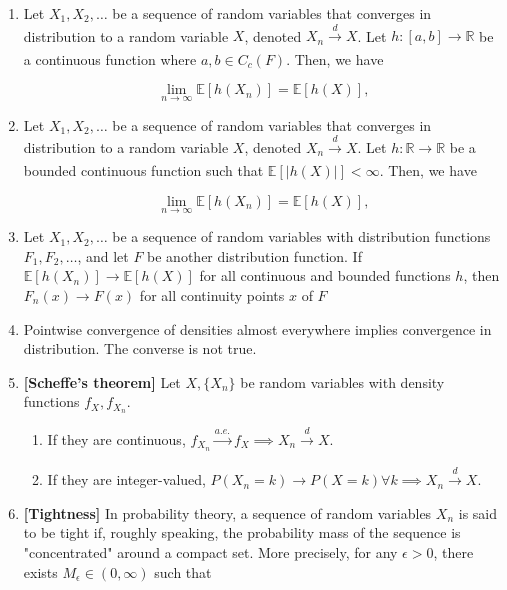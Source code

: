 \documentclass[12pt,oneside]{book}
\begin{document}
\begin{enumerate}
\item  Let $X_1, X_2, \ldots$ be a sequence of random variables that converges in distribution to a random variable $X$, denoted $X_n \xrightarrow[]{d} X$. Let $h:[a,b] \rightarrow \mathbb{R}$ be a continuous function where $a,b\in C_c(F)$. Then, we have

\begin{equation*}
\lim_{n\rightarrow \infty} \mathbb{E}[h(X_n)] = \mathbb{E}[h(X)],
\end{equation*}

\item Let $X_1, X_2, \ldots$ be a sequence of random variables that converges in distribution to a random variable $X$, denoted $X_n \xrightarrow[]{d} X$. Let $h: \mathbb{R} \rightarrow \mathbb{R}$ be a bounded continuous function such that $\mathbb{E}[|h(X)|] < \infty$. Then, we have

\begin{equation*}
\lim_{n\rightarrow \infty} \mathbb{E}[h(X_n)] = \mathbb{E}[h(X)],
\end{equation*}


\item  Let $X_1,X_2,\ldots$ be a sequence of random variables with distribution functions $F_1,F_2,\ldots$, and let $F$ be another distribution function. If $\mathbb{E}[h(X_n)] \rightarrow \mathbb{E}[h(X)]$ for all continuous and bounded functions $h$, then $F_n(x) \rightarrow F(x)$ for all continuity points $x$ of $F$
\item Pointwise convergence of densities almost everywhere implies convergence in distribution. The converse is not true.
\item \textbf{[Scheffe's theorem]} Let $X, \{X_n\}$ be random variables with density functions $f_X, f_{X_n}$.
\begin{enumerate}
    \item If they are continuous, $f_{X_n}\xrightarrow{a.e.} f_X\implies X_n\xrightarrow[]{d}X$.
    \item If they are integer-valued, $P(X_n=k)\rightarrow P(X=k) \forall k\implies X_n\xrightarrow{d}X$.
\end{enumerate}


\item \textbf{[Tightness]} In probability theory, a sequence of random variables ${X_n}$ is said to be tight if, roughly speaking, the probability mass of the sequence is "concentrated" around a compact set. More precisely, for any $\epsilon > 0$, there exists $M_\epsilon\in(0,\infty)$ such that


\end{enumerate}
\end{document}
